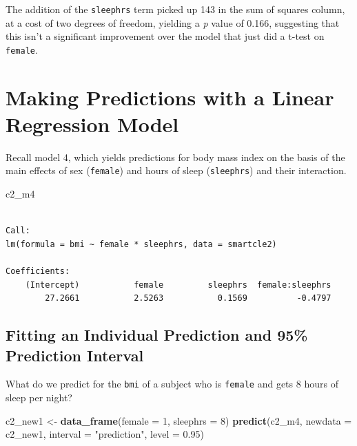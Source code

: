 \documentclass[]{book}
\newenvironment{Shaded}{\begin{snugshade}}{\end{snugshade}}
\newcommand{\KeywordTok}[1]{\textcolor[rgb]{0.13,0.29,0.53}{\textbf{#1}}}
\newcommand{\DataTypeTok}[1]{\textcolor[rgb]{0.13,0.29,0.53}{#1}}
\newcommand{\DecValTok}[1]{\textcolor[rgb]{0.00,0.00,0.81}{#1}}
\newcommand{\FloatTok}[1]{\textcolor[rgb]{0.00,0.00,0.81}{#1}}
\newcommand{\StringTok}[1]{\textcolor[rgb]{0.31,0.60,0.02}{#1}}
\newcommand{\NormalTok}[1]{#1}
\theoremstyle{definition}
\theoremstyle{definition}
\theoremstyle{definition}
\theoremstyle{remark}
\begin{document}
The addition of the \texttt{sleephrs} term picked up 143 in the sum of
squares column, at a cost of two degrees of freedom, yielding a \emph{p}
value of 0.166, suggesting that this isn't a significant improvement
over the model that just did a t-test on \texttt{female}.

\section{Making Predictions with a Linear Regression
Model}\label{making-predictions-with-a-linear-regression-model}

Recall model 4, which yields predictions for body mass index on the
basis of the main effects of sex (\texttt{female}) and hours of sleep
(\texttt{sleephrs}) and their interaction.

\begin{Shaded}
\begin{Highlighting}[]
\NormalTok{c2_m4}
\end{Highlighting}
\end{Shaded}

\begin{verbatim}

Call:
lm(formula = bmi ~ female * sleephrs, data = smartcle2)

Coefficients:
    (Intercept)           female         sleephrs  female:sleephrs  
        27.2661           2.5263           0.1569          -0.4797  
\end{verbatim}

\subsection{Fitting an Individual Prediction and 95\% Prediction
Interval}\label{fitting-an-individual-prediction-and-95-prediction-interval}

What do we predict for the \texttt{bmi} of a subject who is
\texttt{female} and gets 8 hours of sleep per night?

\begin{Shaded}
\begin{Highlighting}[]
\NormalTok{c2_new1 <-}\StringTok{ }\KeywordTok{data_frame}\NormalTok{(}\DataTypeTok{female =} \DecValTok{1}\NormalTok{, }\DataTypeTok{sleephrs =} \DecValTok{8}\NormalTok{)}
\KeywordTok{predict}\NormalTok{(c2_m4, }\DataTypeTok{newdata =}\NormalTok{ c2_new1, }\DataTypeTok{interval =} \StringTok{"prediction"}\NormalTok{, }\DataTypeTok{level =} \FloatTok{0.95}\NormalTok{)}
\end{Highlighting}
\end{Shaded}
\end{document}
